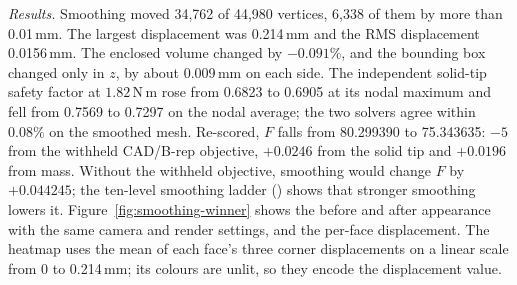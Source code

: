 \begin{table}[t]
\centering\small
\caption{ of the design as exported and after smoothing, in points out of 100.}
\label{tab:smoothing-score}
\end{table}

\textit{Results.} Smoothing moved 34,762 of 44,980 vertices, 6,338 of them by more than 0.01\,mm. The largest displacement was 0.214\,mm and the RMS displacement 0.0156\,mm. The enclosed volume changed by $-0.091\%$, and the bounding box changed only in $z$, by about 0.009\,mm on each side. The independent solid-tip safety factor at $1.82\,\mathrm{N\,m}$ rose from 0.6823 to 0.6905 at its nodal maximum and fell from 0.7569 to 0.7297 on the nodal average; the two solvers agree within $0.08\%$ on the smoothed mesh. Re-scored, $F$ falls from 80.299390 to 75.343635: $-5$ from the withheld CAD/B-rep objective, $+0.0246$ from the solid tip and $+0.0196$ from mass. Without the withheld objective, smoothing would change $F$ by $+0.044245$; the ten-level smoothing ladder () shows that stronger smoothing lowers it. Figure~\ref{fig:smoothing-winner} shows the before and after appearance with the same camera and render settings, and the per-face displacement. The heatmap uses the mean of each face's three corner displacements on a linear scale from 0 to 0.214\,mm; its colours are unlit, so they encode the displacement value.

